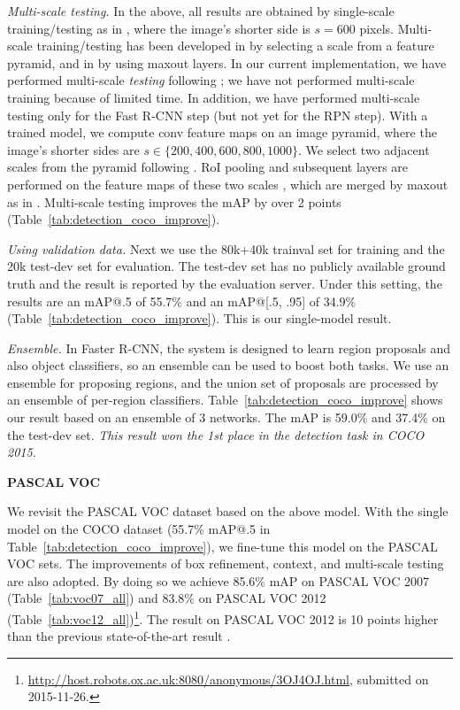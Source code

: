 \documentclass{article}
\begin{document}
\vspace{.5em}
\noindent\emph{Multi-scale testing.} In the above, all results are obtained by single-scale training/testing as in \cite{Ren2015}, where the image's shorter side is $s=600$ pixels. Multi-scale training/testing has been developed in \cite{He2014,Girshick2015} by selecting a scale from a feature pyramid, and in \cite{Ren2015a} by using maxout layers. In our current implementation, we have performed multi-scale \emph{testing} following \cite{Ren2015a}; we have not performed multi-scale training because of limited time. In addition, we have performed multi-scale testing only for the Fast R-CNN step (but not yet for the RPN step).
With a trained model, we compute conv feature maps on an image pyramid, where the image's shorter sides are $s\in\{200, 400, 600, 800, 1000\}$. We select two adjacent scales from the pyramid following \cite{Ren2015a}. RoI pooling and subsequent layers are performed on the feature maps of these two scales \cite{Ren2015a}, which are merged by maxout as in \cite{Ren2015a}.
Multi-scale testing improves the mAP by over 2 points (Table~\ref{tab:detection_coco_improve}).

\vspace{.5em}
\noindent\emph{Using validation data.} Next we use the 80k+40k trainval set for training and the 20k test-dev set for evaluation. The test-dev set has no publicly available ground truth and the result is reported by the evaluation server. Under this setting, the results are an mAP@.5 of 55.7\% and an mAP@[.5, .95] of 34.9\% (Table~\ref{tab:detection_coco_improve}). This is our single-model result.

\vspace{.5em}
\noindent\emph{Ensemble.} In Faster R-CNN, the system is designed to learn region proposals and also object classifiers, so an ensemble can be used to boost both tasks. We use an ensemble for proposing regions, and the union set of proposals are processed by an ensemble of per-region classifiers.
Table~\ref{tab:detection_coco_improve} shows our result based on an ensemble of 3 networks. The mAP is 59.0\% and 37.4\% on the test-dev set. \emph{This result won the 1st place in the detection task in COCO 2015.}


\vspace{1em}
\noindent\textbf{PASCAL VOC}

We revisit the PASCAL VOC dataset based on the above model. With the single model on the COCO dataset (55.7\% mAP@.5 in Table~\ref{tab:detection_coco_improve}), we fine-tune this model on the PASCAL VOC sets. The improvements of box refinement, context, and multi-scale testing are also adopted. By doing so we achieve 85.6\% mAP on PASCAL VOC 2007 (Table~\ref{tab:voc07_all}) and 83.8\% on PASCAL VOC 2012 (Table~\ref{tab:voc12_all})\footnote{\fontsize{6.5pt}{1em}\selectfont\url{http://host.robots.ox.ac.uk:8080/anonymous/3OJ4OJ.html}, submitted on 2015-11-26.}. The result on PASCAL VOC 2012 is 10 points higher than the previous state-of-the-art result \cite{Gidaris2015}.
\end{document}
